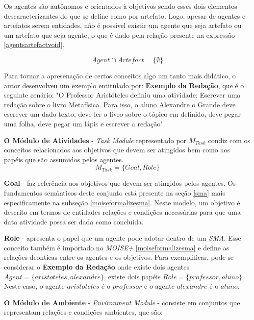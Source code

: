Os agentes são autônomos e orientados à objetivos sendo esses dois elementos descaracterizantes do que se define como por artefato. Logo, apesar de agentes e artefatos serem entidades, não é possível existir um agente que seja artefato ou um artefato que seja agente, o que é dado pela relação presente na expressão \ref{agentsartefactvoid}. 

\begin{equation} \label{agentsartefactvoid}
    Agent \cap Artefact = \{ \emptyset \}
\end{equation}

Para tornar a apresenação de certos conceitos algo um tanto mais didático, o autor desenvolveu um exemplo entitulado por: \textbf{Exemplo da Redação}, que é o seguinte cenário: "O Professor Aristóteles definiu uma atividade: Escrever uma redação sobre o livro Metafísica. Para isso, o aluno Alexandre o Grande deve escrever um dado texto, deve ler o livro sobre o tópico em definido, deve pegar uma folha, deve pegar um lápis e escrever a redação".  


\textbf{O Módulo de Atividades} - \textit{Task Module} representado por $M_{Task}$ condiz com os conceitos relacionados aos objetivos que devem ser atingidos bem como aos papéis que são assumidos pelos agentes.
\begin{equation}
    M_{Task} = \{ Goal, Role \}
\end{equation}

\textbf{Goal} - faz referência aos objetivos que devem ser atingidos pelos agentes. Os fundamentos semânticos deste conjunto está presente na seção \ref{sma} mais especificamente na subseção \ref{moiseformalizesma}. Neste modelo, um objetivo é descrito em termos de entidades relações e condições necessárias para que uma data atividade possa ser dada como concluída. 

\textbf{Role} - apresenta o papel que um agente pode adotar dentro de um \textit{SMA}. Esse conceito também é importado no \textit{MOISE+} 
\ref{moiseformalizesma} e define as relações deonticas entre os agentes e os objetivos. Para exemplificar, pode-se considerar o \textbf{Exemplo da Redação} onde existe dois agentes $Agent = \{ aristoteles, alexandre \}$, existe dois papéis $Role = \{ professor, aluno\}$. Neste caso, o agente $aristoteles$ é o $professor$ e o agente $alexandre$ é o $aluno$.

\textbf{O Módulo de Ambiente} - \textit{Environment Module} - consiste em conjuntos que representam relações e condições ambientes, que são:

